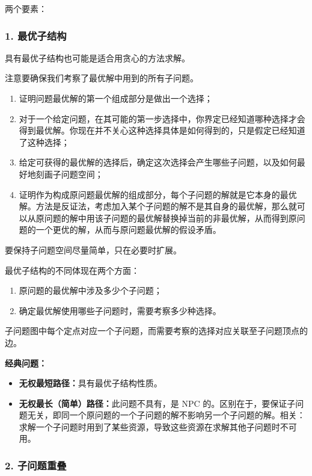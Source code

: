 两个要素：

\subsubsection{1. 最优子结构}

具有最优子结构也可能是适合用贪心的方法求解。

注意要确保我们考察了最优解中用到的所有子问题。

\begin{enumerate}
\item 证明问题最优解的第一个组成部分是做出一个选择；
\item 对于一个给定问题，在其可能的第一步选择中，你界定已经知道哪种选择才会得到最优解。你现在并不关心这种选择具体是如何得到的，只是假定已经知道了这种选择；
\item 给定可获得的最优解的选择后，确定这次选择会产生哪些子问题，以及如何最好地刻画子问题空间；
\item 证明作为构成原问题最优解的组成部分，每个子问题的解就是它本身的最优解。方法是反证法，考虑加入某个子问题的解不是其自身的最优解，那么就可以从原问题的解中用该子问题的最优解替换掉当前的非最优解，从而得到原问题的一个更优的解，从而与原问题最优解的假设矛盾。
\end{enumerate}

要保持子问题空间尽量简单，只在必要时扩展。

最优子结构的不同体现在两个方面：

\begin{enumerate}
\item 原问题的最优解中涉及多少个子问题；
\item 确定最优解使用哪些子问题时，需要考察多少种选择。
\end{enumerate}

子问题图中每个定点对应一个子问题，而需要考察的选择对应关联至子问题顶点的边。

\textbf{经典问题：}

\begin{itemize}
\item \textbf{无权最短路径：}具有最优子结构性质。
\item \textbf{无权最长（简单）路径：}此问题不具有，是 NPC 的。区别在于，要保证子问题无关，即同一个原问题的一个子问题的解不影响另一个子问题的解。相关：求解一个子问题时用到了某些资源，导致这些资源在求解其他子问题时不可用。
\end{itemize}

\subsubsection{2. 子问题重叠}

